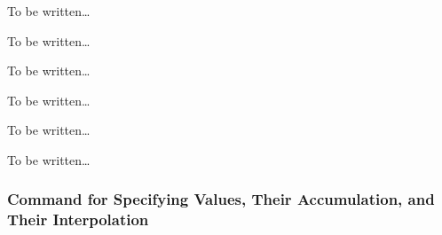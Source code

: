 \begin{command}{\pgfsys@animation@offset{}}
  To be written\dots
\end{command}

\begin{command}{\pgfsys@animation@syncbegin{}}
  To be written\dots
\end{command}

\begin{command}{\pgfsys@animation@syncend{}}
  To be written\dots
\end{command}

\begin{command}{\pgfsys@animation@event{}}
  To be written\dots
\end{command}

\begin{command}{\pgfsys@animation@repeat@event{}}
  To be written\dots
\end{command}

\begin{command}{\pgfsys@animation@accesskey{}}
  To be written\dots
\end{command}


\subsubsection{Command for Specifying Values, Their Accumulation, and
  Their Interpolation}
\label{section-value-types}




